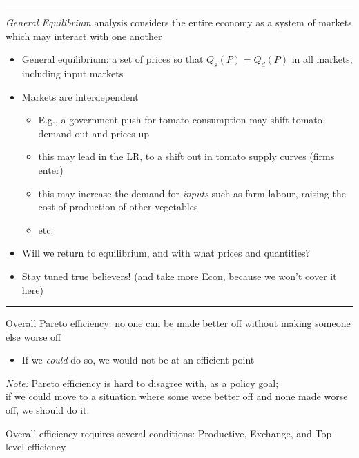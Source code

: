 \documentclass[]{article}
\providecommand{\tightlist}{%
  \setlength{\itemsep}{0pt}\setlength{\parskip}{0pt}}
\begin{document}
\begin{center}\rule{0.5\linewidth}{\linethickness}\end{center}

\emph{General Equilibrium} analysis considers the entire economy as a
system of markets which may interact with one another

\begin{itemize}
\tightlist
\item
  General equilibrium: a set of prices so that \(Q_s(P)=Q_d(P)\) in all
  markets, including input markets
\item
  Markets are interdependent

  \begin{itemize}
  \tightlist
  \item
    E.g., a government push for tomato consumption may shift tomato
    demand out and prices up
  \item
    this may lead in the LR, to a shift out in tomato supply curves
    (firms enter)
  \item
    this may increase the demand for \emph{inputs} such as farm labour,
    raising the cost of production of other vegetables
  \item
    etc.
  \end{itemize}
\item
  Will we return to equilibrium, and with what prices and quantities?
\item
  Stay tuned true believers! (and take more Econ, because we won't cover
  it here)
\end{itemize}

\begin{center}\rule{0.5\linewidth}{\linethickness}\end{center}

Overall Pareto efficiency: no one can be made better off without making
someone else worse off

\begin{itemize}
\tightlist
\item
  If we \emph{could} do so, we would not be at an efficient point
\end{itemize}

\emph{Note:} Pareto efficiency is hard to disagree with, as a policy
goal;\\
if we could move to a situation where some were better off and none made
worse off, we should do it.

Overall efficiency requires several conditions: Productive, Exchange,
and Top-level efficiency
\end{document}
